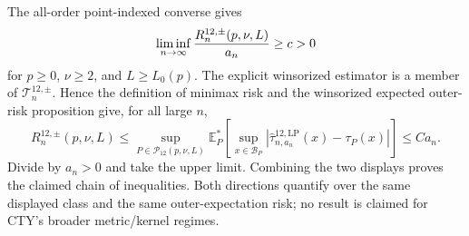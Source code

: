 The all-order point-indexed converse gives
\[
 \liminf_{n\to\infty}{R_n^{12,\pm}(p,\nu,L)\over a_n}\geq c>0
\]
for \(p\geq0\), \(\nu\geq2\), and \(L\geq L_0(p)\).  The explicit winsorized estimator is a member of \(\mathcal T_n^{12,\pm}\).  Hence the definition of minimax risk and the winsorized expected outer-risk proposition give, for all large \(n\),
\[
 R_n^{12,\pm}(p,\nu,L)
 \leq \sup_{P\in\mathcal P_{12}(p,\nu,L)}
 \mathbb E_P^*\!\left[
 \sup_{x\in\mathcal B_P}
 |\widehat\tau^{12,\mathrm{LP}}_{n,a_n}(x)-\tau_P(x)|
 \right]
 \leq Ca_n.
\]
Divide by \(a_n>0\) and take the upper limit.  Combining the two displays proves the claimed chain of inequalities.  Both directions quantify over the same displayed class and the same outer-expectation risk; no result is claimed for CTY's broader metric/kernel regimes.
